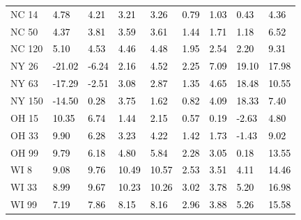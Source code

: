 \begin{tabular}{lllllllll}
NC 14 & \textcolor{black}{ 4.78 } & \textcolor{black}{ 4.21 } & \textcolor{black}{ 3.21 } & \textcolor{black}{ 3.26 } & \textcolor{black}{ 0.79 } & \textcolor{black}{ 1.03 } & \textcolor{black}{ 0.43 } & \textcolor{black}{ 4.36 } \\
NC 50 & \textcolor{black}{ 4.37 } & \textcolor{black}{ 3.81 } & \textcolor{black}{ 3.59 } & \textcolor{black}{ 3.61 } & \textcolor{black}{ 1.44 } & \textcolor{black}{ 1.71 } & \textcolor{black}{ 1.18 } & \textcolor{black}{ 6.52 } \\
NC 120 & \textcolor{black}{ 5.10 } & \textcolor{black}{ 4.53 } & \textcolor{black}{ 4.46 } & \textcolor{black}{ 4.48 } & \textcolor{black}{ 1.95 } & \textcolor{black}{ 2.54 } & \textcolor{black}{ 2.20 } & \textcolor{black}{ 9.31 } \\
NY 26 & \textcolor{black}{ -21.02 } & \textcolor{black}{ -6.24 } & \textcolor{black}{ 2.16 } & \textcolor{black}{ 4.52 } & \textcolor{black}{ 2.25 } & \textcolor{black}{ 7.09 } & \textcolor{black}{ 19.10 } & \textcolor{black}{ 17.98 } \\
NY 63 & \textcolor{black}{ -17.29 } & \textcolor{black}{ -2.51 } & \textcolor{black}{ 3.08 } & \textcolor{black}{ 2.87 } & \textcolor{black}{ 1.35 } & \textcolor{black}{ 4.65 } & \textcolor{black}{ 18.48 } & \textcolor{black}{ 10.55 } \\
NY 150 & \textcolor{black}{ -14.50 } & \textcolor{black}{ 0.28 } & \textcolor{black}{ 3.75 } & \textcolor{black}{ 1.62 } & \textcolor{black}{ 0.82 } & \textcolor{black}{ 4.09 } & \textcolor{black}{ 18.33 } & \textcolor{black}{ 7.40 } \\
OH 15 & \textcolor{black}{ 10.35 } & \textcolor{black}{ 6.74 } & \textcolor{black}{ 1.44 } & \textcolor{black}{ 2.15 } & \textcolor{black}{ 0.57 } & \textcolor{black}{ 0.19 } & \textcolor{black}{ -2.63 } & \textcolor{black}{ 4.80 } \\
OH 33 & \textcolor{black}{ 9.90 } & \textcolor{black}{ 6.28 } & \textcolor{black}{ 3.23 } & \textcolor{black}{ 4.22 } & \textcolor{black}{ 1.42 } & \textcolor{black}{ 1.73 } & \textcolor{black}{ -1.43 } & \textcolor{black}{ 9.02 } \\
OH 99 & \textcolor{black}{ 9.79 } & \textcolor{black}{ 6.18 } & \textcolor{black}{ 4.80 } & \textcolor{black}{ 5.84 } & \textcolor{black}{ 2.28 } & \textcolor{black}{ 3.05 } & \textcolor{black}{ 0.18 } & \textcolor{black}{ 13.55 } \\
WI 8 & \textcolor{black}{ 9.08 } & \textcolor{black}{ 9.76 } & \textcolor{black}{ 10.49 } & \textcolor{black}{ 10.57 } & \textcolor{black}{ 2.53 } & \textcolor{black}{ 3.51 } & \textcolor{black}{ 4.11 } & \textcolor{black}{ 14.46 } \\
WI 33 & \textcolor{black}{ 8.99 } & \textcolor{black}{ 9.67 } & \textcolor{black}{ 10.23 } & \textcolor{black}{ 10.26 } & \textcolor{black}{ 3.02 } & \textcolor{black}{ 3.78 } & \textcolor{black}{ 5.20 } & \textcolor{black}{ 16.98 } \\
WI 99 & \textcolor{black}{ 7.19 } & \textcolor{black}{ 7.86 } & \textcolor{black}{ 8.15 } & \textcolor{black}{ 8.16 } & \textcolor{black}{ 2.96 } & \textcolor{black}{ 3.88 } & \textcolor{black}{ 5.26 } & \textcolor{black}{ 15.58 } \\
\bottomrule
\end{tabular}
